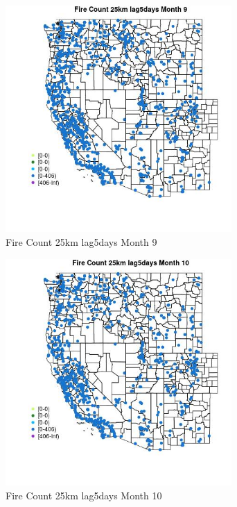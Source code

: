 \begin{figure} 
\centering  
\includegraphics[width=0.77\textwidth]{Code_Outputs/Report_ML_input_PM25_Step4_part_f_de_duplicated_aves_prioritize_24hr_obswNAs_MapObsMo9Fire_Count_25km_lag5days.jpg} 
\caption{\label{fig:Report_ML_input_PM25_Step4_part_f_de_duplicated_aves_prioritize_24hr_obswNAsMapObsMo9Fire_Count_25km_lag5days}Fire Count 25km lag5days Month 9} 
\end{figure} 
 

\begin{figure} 
\centering  
\includegraphics[width=0.77\textwidth]{Code_Outputs/Report_ML_input_PM25_Step4_part_f_de_duplicated_aves_prioritize_24hr_obswNAs_MapObsMo10Fire_Count_25km_lag5days.jpg} 
\caption{\label{fig:Report_ML_input_PM25_Step4_part_f_de_duplicated_aves_prioritize_24hr_obswNAsMapObsMo10Fire_Count_25km_lag5days}Fire Count 25km lag5days Month 10} 
\end{figure} 
 

